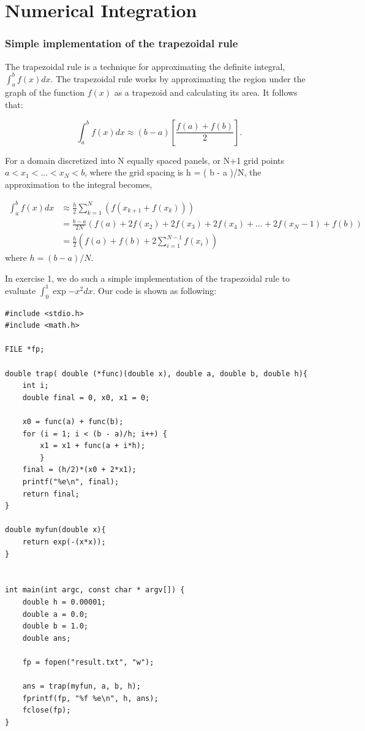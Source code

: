 \documentclass{article}
\begin{document}
\section{Numerical Integration}
\subsubsection{Simple implementation of the trapezoidal rule}

The trapezoidal rule is a technique for approximating the definite integral, $\int_{a}^{b} f(x) dx$. The trapezoidal rule works by approximating the region under the graph of the function $f(x)$ as a trapezoid and calculating its area. It follows that:

\begin{equation}
\int_{a}^{b} f(x) dx \approx  (b - a)[\frac{f(a)+f(b)}{2}].
\end{equation}

For a domain discretized into N equally spaced panels, or N+1 grid points $a  < x_1<...<x_{N} < b$, where the grid spacing is  h = ( b - a )/N, the approximation to the integral becomes,

\begin{equation}\label{eq1}
\begin{split}
\int_{a}^{b} f(x) dx &\approx \frac{h}{2}\sum_{k=1}^{N}(f(x_{k+1}+f(x_k))) \\
& = \frac{b-a}{2N}(f(a) + 2f(x_2) + 2f(x_3) + 2f(x_4) + ... + 2f(x_N-1) +f(b)) \\
& = \frac{h}{2}(f(a) + f(b) + 2 \sum_{i=1}^{N-1}f(x_i))
\end{split}
\end{equation}
where $h = (b - a)/N$.

In exercise 1, we do such a simple implementation of the trapezoidal rule to evaluate $\int_{0}^{1} \exp{-x^2}dx$. Our code is shown as following:


\begin{lstlisting}
#include <stdio.h>
#include <math.h>

FILE *fp;

double trap( double (*func)(double x), double a, double b, double h){
    int i;
    double final = 0, x0, x1 = 0;
    
    x0 = func(a) + func(b);
    for (i = 1; i < (b - a)/h; i++) {
        x1 = x1 + func(a + i*h);
        }
    final = (h/2)*(x0 + 2*x1);
    printf("%e\n", final);
    return final;
}

double myfun(double x){
    return exp(-(x*x));
}


int main(int argc, const char * argv[]) {
    double h = 0.00001;
    double a = 0.0;
    double b = 1.0;
    double ans;
    
    fp = fopen("result.txt", "w");
    
    ans = trap(myfun, a, b, h);
    fprintf(fp, "%f %e\n", h, ans);
    fclose(fp);
}
\end{lstlisting}
\end{document}
